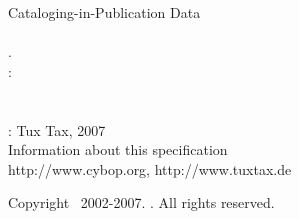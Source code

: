 %
%
%
%
%
%

\small{Cataloging-in-Publication Data\\\\
    \authormacro.\\
    \titlemacro:\\
    \subtitlemacro\\
    \versionmacro\\
    \placemacro: Tux Tax, 2007%
}\\

\small{Information about this specification\\
    http://www.cybop.org, http://www.tuxtax.de}

\vspace{4cm}

\small{Copyright \textcopyright\ 2002-2007. \authormacro. All rights reserved.}

